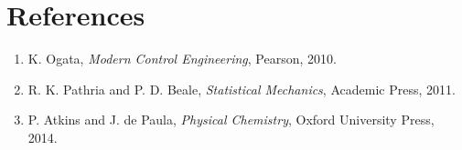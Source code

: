 \documentclass[10pt,journal,compsoc]{IEEEtran}
\begin{document}
\section*{References}
\begin{small}
\begin{enumerate}
    \item K. Ogata, \textit{Modern Control Engineering}, Pearson, 2010.
    \item R. K. Pathria and P. D. Beale, \textit{Statistical Mechanics}, Academic Press, 2011.
    \item P. Atkins and J. de Paula, \textit{Physical Chemistry}, Oxford University Press, 2014.
\end{enumerate}
\end{small}
\end{document}
